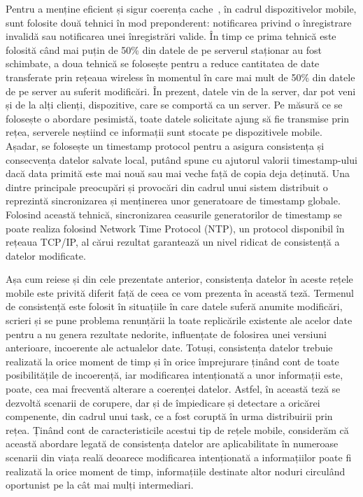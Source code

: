 \documentclass[12pt,a4paper]{report}
\begin{document}
Pentru a menține eficient și sigur coerența cache~\cite{knaesel2009high}, în cadrul dispozitivelor mobile, sunt folosite două tehnici în mod preponderent: notificarea privind o înregistrare invalidă sau notificarea unei înregistrări valide. În timp ce prima tehnică este folosită când mai puțin de 50\% din datele de pe serverul staționar au fost schimbate, a doua tehnică se folosește pentru a reduce cantitatea de date transferate prin rețeaua wireless în momentul în care mai mult de 50\% din datele de pe server au suferit modificări. În prezent, datele vin de la server, dar pot veni și de la alți clienți, dispozitive, care se comportă ca un server. Pe măsură ce se folosește o abordare pesimistă, toate datele solicitate ajung să fie transmise prin rețea, serverele neștiind ce informații sunt stocate pe dispozitivele mobile. Așadar, se folosește un timestamp protocol pentru a asigura consistența și consecvența datelor salvate local, putând spune cu ajutorul valorii timestamp-ului dacă data primită este mai nouă sau mai veche față de copia deja deținută. Una dintre principale preocupări și provocări din cadrul unui sistem distribuit o reprezintă sincronizarea și menținerea unor generatoare de timestamp globale. Folosind această tehnică, sincronizarea ceasurile generatorilor de timestamp se poate realiza folosind Network Time Protocol (NTP), un protocol disponibil în rețeaua TCP/IP, al cărui rezultat garantează un nivel ridicat de consistență a datelor modificate.

Așa cum reiese și din cele prezentate anterior, consistența datelor în aceste rețele mobile este privită diferit față de ceea ce vom prezenta în această teză. Termenul de consistență este folosit în situațiile în care datele suferă anumite modificări, scrieri și se pune problema renunțării la toate replicările existente ale acelor date pentru a nu genera rezultate nedorite, influențate de folosirea unei versiuni anterioare, incoerente ale actualelor date. Totuși, consistența datelor trebuie realizată la orice moment de timp și în orice împrejurare ținând cont de toate posibilitățile de incoerență, iar modificarea intenționată a unor informații este, poate, cea mai frecventă alterare a coerenței datelor. Astfel, în această teză se dezvoltă scenarii de corupere, dar și de împiedicare și detectare a oricărei compenente, din cadrul unui task, ce a fost coruptă în urma distribuirii prin rețea. Ținând cont de caracteristicile acestui tip de rețele mobile, considerăm că această abordare legată de consistența datelor are aplicabilitate în numeroase scenarii din viața reală deoarece modificarea intenționată a informațiilor poate fi realizată la orice moment de timp, informațiile destinate altor noduri circulând oportunist pe la cât mai mulți intermediari.
\end{document}
